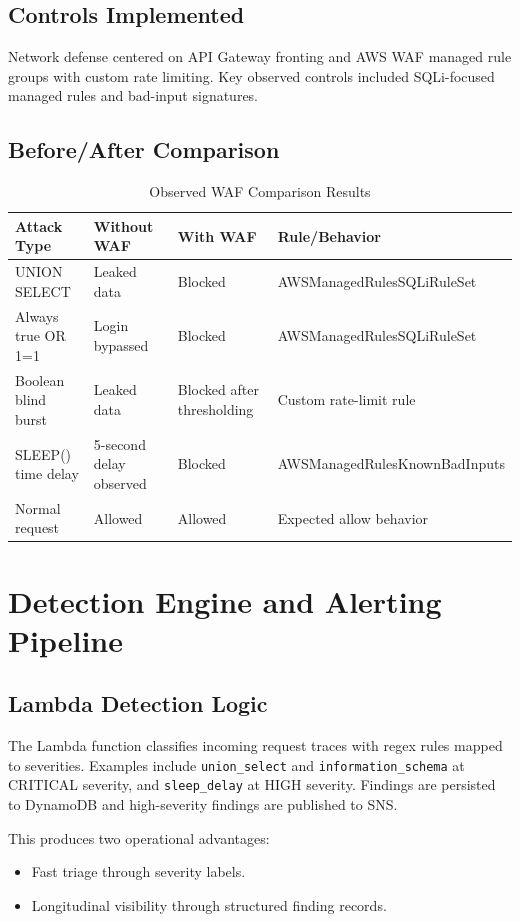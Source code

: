\documentclass[12pt,a4paper]{article}
\begin{document}
\subsection{Controls Implemented}
Network defense centered on API Gateway fronting and AWS WAF managed rule groups with custom rate limiting. Key observed controls included SQLi-focused managed rules and bad-input signatures.

\subsection{Before/After Comparison}
\begin{table}[H]
\centering
\caption{Observed WAF Comparison Results}
\begin{tabular}{p{} p{} p{} p{}}
\toprule
\textbf{Attack Type} & \textbf{Without WAF} & \textbf{With WAF} & \textbf{Rule/Behavior} \\
\midrule
UNION SELECT & Leaked data & Blocked & AWSManagedRulesSQLiRuleSet \\
Always true OR 1=1 & Login bypassed & Blocked & AWSManagedRulesSQLiRuleSet \\
Boolean blind burst & Leaked data & Blocked after thresholding & Custom rate-limit rule \\
SLEEP() time delay & 5-second delay observed & Blocked & AWSManagedRulesKnownBadInputs \\
Normal request & Allowed & Allowed & Expected allow behavior \\
\bottomrule
\end{tabular}
\end{table}

\section{Detection Engine and Alerting Pipeline}
\subsection{Lambda Detection Logic}
The Lambda function classifies incoming request traces with regex rules mapped to severities. Examples include \texttt{union\_select} and \texttt{information\_schema} at CRITICAL severity, and \texttt{sleep\_delay} at HIGH severity. Findings are persisted to DynamoDB and high-severity findings are published to SNS.

This produces two operational advantages:
\begin{itemize}
  \item Fast triage through severity labels.
  \item Longitudinal visibility through structured finding records.
\end{itemize}
\end{document}
